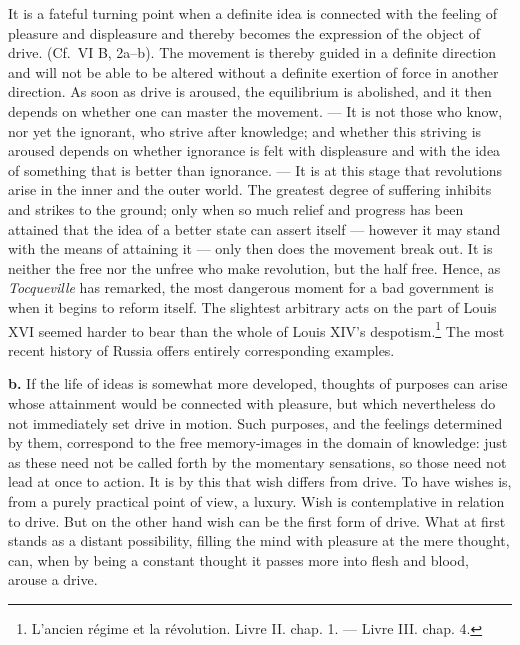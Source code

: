 \documentclass[12pt,a4paper]{book}
\newcommand{\opage}[1]{\marginnote{\footnotesize\textit{[#1]}}}
\begin{document}
It is a fateful turning point when a definite idea is connected with the
feeling of pleasure and displeasure and thereby
\opage{381}becomes the expression of the object of drive. (Cf.\ VI B,
2a--b). The movement is thereby guided in a definite direction and will
not be able to be altered without a definite exertion of force in another
direction. As soon as drive is aroused, the equilibrium is abolished, and
it then depends on whether one can master the movement. --- It is not
those who know, nor yet the ignorant, who strive after knowledge; and
whether this striving is aroused depends on whether ignorance is felt with
displeasure and with the idea of something that is better than ignorance.
--- It is at this stage that revolutions arise in the inner and the outer
world. The greatest degree of suffering inhibits and strikes to the
ground; only when so much relief and progress has been attained that the
idea of a better state can assert itself --- however it may stand with
the means of attaining it --- only then does the movement break out. It
is neither the free nor the unfree who make revolution, but the half
free. Hence, as \emph{Tocqueville} has remarked, the most dangerous moment
for a bad government is when it begins to reform itself. The slightest
arbitrary acts on the part of Louis XVI seemed harder to bear than the
whole of Louis XIV's
despotism.\footnote{L’ancien régime et la révolution. Livre II. chap.
1. --- Livre III. chap. 4.} The most recent history of Russia offers
entirely corresponding examples.

\textbf{b.} If the life of ideas is somewhat more developed, thoughts of
purposes can arise whose attainment would be connected with pleasure, but
which nevertheless do not immediately set drive in motion. Such purposes,
and the feelings determined by them, correspond to the free memory-images
in the domain of knowledge: just as these need not be called forth by the
momentary sensations, so those need not lead at once to action. It is by
this that wish differs from drive. To have wishes is, from a purely
practical point of view, a luxury. Wish is contemplative in relation to
drive. But on the other hand wish can be the first form of drive. What at
first stands as a distant possibility, filling the mind with pleasure at
the mere thought, can, when by being a constant thought it passes more
into flesh and blood, arouse a drive.
\end{document}
